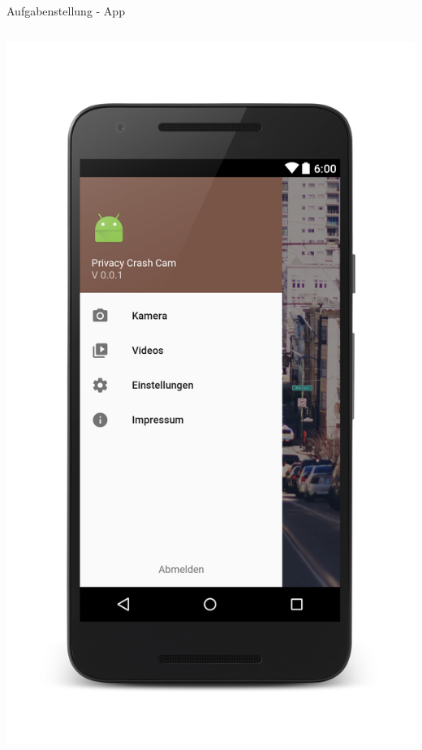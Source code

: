 \documentclass[19pt]{beamer}
\begin{document}
\begin{frame}{Aufgabenstellung - App}
\begin{columns}[T]
\begin{column}{.5\textwidth}
    		\includegraphics[scale=0.075]{logos/Mockups/Portrait_camera_view_menu_phone}
    \end{column}
  \end{columns}
\end{frame}
\end{document}
